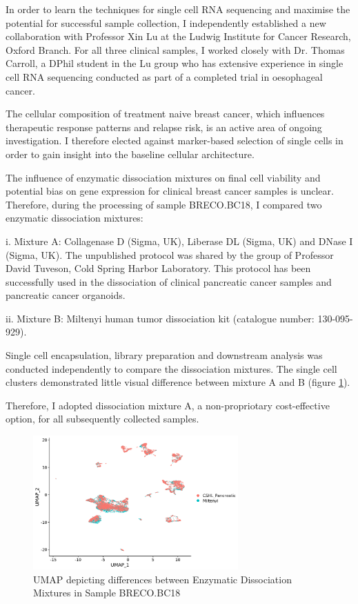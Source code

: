 In order to learn the techniques for single cell RNA sequencing and maximise the potential for successful sample collection, I independently established a new collaboration with Professor Xin Lu at the Ludwig Institute for Cancer Research, Oxford Branch. For all three clinical samples, I worked closely with Dr. Thomas Carroll, a DPhil student in the Lu group who has extensive experience in single cell RNA sequencing conducted as part of a completed trial in oesophageal cancer.

The cellular composition of treatment naive breast cancer, which influences therapeutic response patterns and relapse risk, is an active area of ongoing investigation. I therefore elected against marker-based selection of single cells in order to gain insight into the baseline cellular architecture.

The influence of enzymatic dissociation mixtures on final cell viability and potential bias on gene expression for clinical breast cancer samples is unclear. Therefore, during the processing of sample BRECO.BC18, I compared two enzymatic dissociation mixtures:

i. Mixture A: Collagenase D (Sigma, UK), Liberase DL (Sigma, UK) and DNase I (Sigma, UK). The unpublished protocol was shared by the group of Professor David Tuveson, Cold Spring Harbor Laboratory. This protocol has been successfully used in the dissociation of clinical pancreatic cancer samples and pancreatic cancer organoids.

ii. Mixture B: Miltenyi human tumor dissociation kit (catalogue number: 130-095-929).

Single cell encapsulation, library preparation and downstream analysis was conducted independently to compare the dissociation mixtures. The single cell clusters demonstrated little visual difference between mixture A and B (figure \ref{fig:bro18_dissociation_miltenyi_vs_cshl}). 

Therefore, I adopted dissociation mixture A, a non-propriotary cost-effective option, for all subsequently collected samples.


\begin{figure}
	\centering
	\includegraphics[width=0.7\textwidth]{figures/bro18_dissociation_miltenyi_vs_cshl.png} 
	\caption[Comparison of Dissociation Mixtures.]{UMAP depicting differences between Enzymatic Dissociation Mixtures in Sample BRECO.BC18}
	\label{fig:bro18_dissociation_miltenyi_vs_cshl}
\end{figure}



